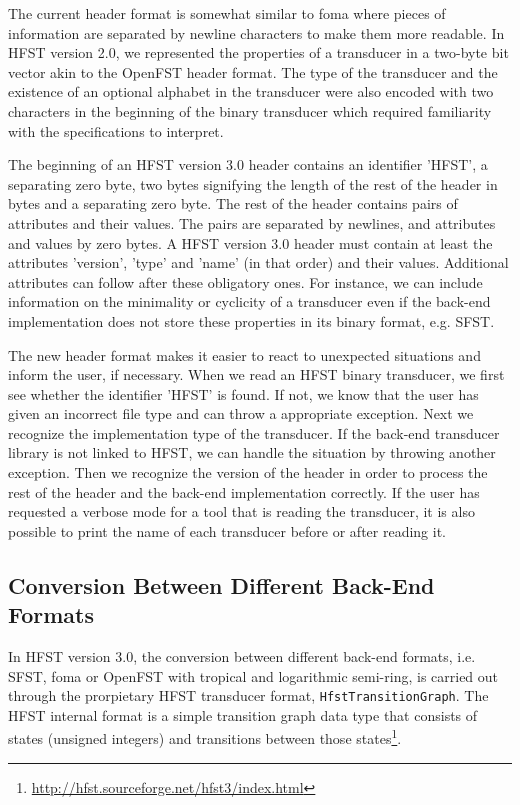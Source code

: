 \documentclass{llncs}
\begin{document}
The current header format is somewhat similar to foma where pieces of 
information are separated by newline characters to make them more
readable. In HFST version 2.0, we represented the properties of a
transducer in a two-byte bit vector akin to the OpenFST header
format. The type of the transducer and the existence of an optional
alphabet in the transducer were also encoded with two characters in the beginning of the
binary transducer which required familiarity with the specifications to interpret.

The beginning of an HFST version 3.0 header contains an identifier
'HFST', a separating zero byte, two bytes signifying the length of
the rest of the header in bytes and a separating zero byte. The rest
of the header contains pairs of attributes and their values. The pairs
are separated by newlines, and attributes and values by zero bytes. 
A HFST version 3.0 header must contain at least the attributes
'version', 'type' and 'name' (in that order) and their values. 
Additional attributes can follow after these obligatory ones. 
For instance, we can include information on the minimality or
cyclicity of a transducer even if the back-end implementation does not
store these properties in its binary format, e.g. SFST. 

The new header format makes it easier to react to unexpected
situations and inform the user, if necessary. When we read an HFST
binary transducer, we first see whether the identifier 'HFST' is
found. If not, we know that the user has given an incorrect
file type and can throw a appropriate exception. 
Next we recognize the implementation type of the transducer. 
If the back-end transducer library is not linked to HFST, we can handle
the situation by throwing another exception. 
Then we recognize the version of the header in order to process 
the rest of the header and the back-end implementation correctly. 
If the user has requested a verbose mode for a tool that is reading the
transducer, it is also possible to print the name of each transducer 
before or after reading it.

\subsection{Conversion Between Different Back-End Formats}
In HFST version 3.0, the conversion between different back-end formats, i.e. 
SFST, foma or OpenFST with tropical and logarithmic semi-ring,  is
carried out through the prorpietary HFST transducer format, \texttt{HfstTransitionGraph}. 
The HFST internal format is a simple transition graph data type that consists 
of states (unsigned integers) and transitions between those 
states\footnote{\url{http://hfst.sourceforge.net/hfst3/index.html}}.
 
\end{document}
